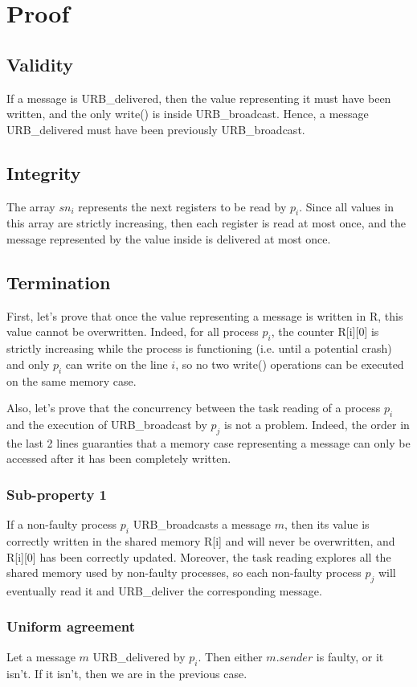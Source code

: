 \documentclass{scrartcl}
\begin{document}
\clearpage
\section{Proof}
\subsection{Validity}
If a message is URB\_delivered, then the value representing it must have been written, and the only write() is inside URB\_broadcast. Hence, a message URB\_delivered must have been previously URB\_broadcast.


\subsection{Integrity}
The array $sn_i$ represents the next registers to be read by $p_i$. Since all values in this array are strictly increasing, then each register is read at most once, and the message represented by the value inside is delivered at most once.

\subsection{Termination}
First, let's prove that once the value representing a message is written in R, this value cannot be overwritten. Indeed, for all process $p_i$, the counter R[i][0] is strictly increasing while the process is functioning (i.e. until a potential crash) and only $p_i$ can write on the line $i$, so no two write() operations can be executed on the same memory case.

Also, let's prove that the concurrency between the task reading of a process $p_i$ and the execution of URB\_broadcast by $p_j$ is not a problem. Indeed, the order in the last 2 lines guaranties that a memory case representing a message can only be accessed after it has been completely written.
\subsubsection{Sub-property 1}
If a non-faulty process $p_i$ URB\_broadcasts a message $m$, then its value is correctly written in the shared memory R[i] and will never be overwritten, and R[i][0] has been correctly updated. Moreover,  the task reading explores all the shared memory used by non-faulty processes, so each non-faulty process $p_j$ will eventually read it and URB\_deliver the corresponding message.
\subsubsection{Uniform agreement}
Let a message $m$ URB\_delivered by $p_i$. Then either $m.sender$ is faulty, or it isn't. If it isn't, then we are in the previous case.
\end{document}
